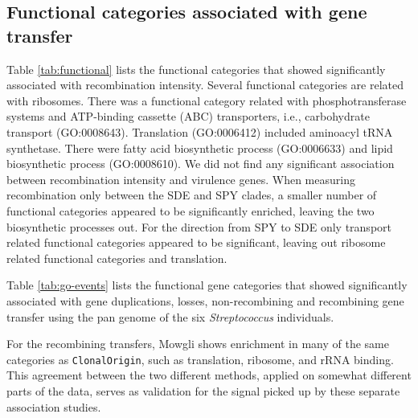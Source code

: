 \documentclass[english]{article}
\begin{document}
\subsection{Functional categories associated with gene transfer}


Table \ref{tab:functional} lists the functional categories that showed
significantly associated with recombination intensity. 
Several functional categories are related with ribosomes.
There was a functional category related with phosphotransferase systems
and ATP-binding cassette (ABC) transporters, i.e., carbohydrate transport
(GO:0008643). Translation (GO:0006412) included aminoacyl tRNA synthetase.
There were fatty acid biosynthetic process (GO:0006633) and lipid
biosynthetic process (GO:0008610). We did not find any significant association 
between recombination intensity and virulence genes. When measuring 
recombination only between the SDE and SPY clades, a smaller number of 
functional categories appeared to be significantly enriched, leaving the two 
biosynthetic processes out. For the direction from SPY to SDE only transport 
related
functional categories appeared to be significant, leaving out ribosome related 
functional categories and translation.



Table \ref{tab:go-events} lists the functional gene categories that
showed significantly associated with gene duplications, losses,
non-recombining and recombining gene transfer using the pan genome of the six
\textit{Streptococcus} individuals.

For the recombining transfers, Mowgli shows enrichment in
many of the same categories as \texttt{ClonalOrigin}, such as translation,
ribosome, and rRNA binding.  This agreement between the two different
methods, applied on somewhat different parts of the data, serves as
validation for the signal picked up by these separate association
studies.  
\end{document}
